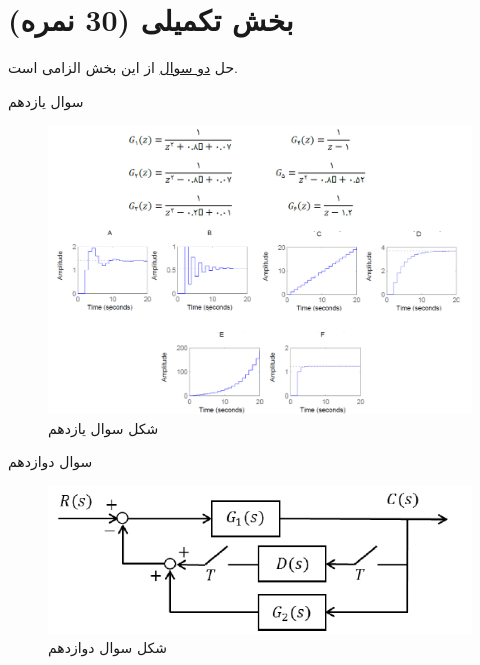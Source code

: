 \documentclass{article}
\begin{document}
\raggedleft
\section{ بخش تکمیلی (30 نمره)}
\centering
حل \underline{دو سوال} از این بخش الزامی است.
\begin{problem}{سوال یازدهم}
	
	
	
\end{problem}
\begin{figure}[htbp]
	\includegraphics[width=\linewidth]{Second Series/1.png}
	\caption{شکل سوال یازدهم}
\end{figure}


\begin{problem}{سوال دوازدهم}



\end{problem}
\begin{figure}
	\includegraphics[width=\linewidth]{Second Series/6.png}
	\caption{شکل سوال دوازدهم}
\end{figure}
\end{document}
